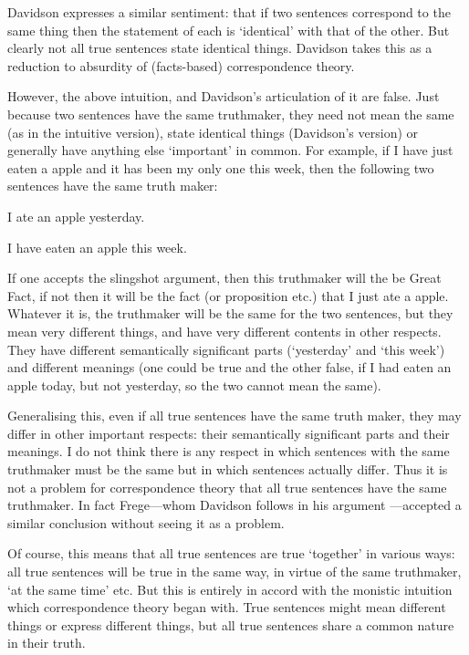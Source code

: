 Davidson expresses a similar sentiment: that if two sentences correspond to the same thing then the statement of each is `identical' with that of the other.
But clearly not all true sentences state identical things.
Davidson takes this as a reduction to absurdity of (facts-based) correspondence theory. %
\parencite[750]{Davidson_1969}

However, the above intuition, and Davidson's articulation of it are false.
Just because two sentences have the same truthmaker, they need not mean the same (as in the intuitive version), state identical things (Davidson's version) or generally have anything else `important' in common.
For example, if I have just eaten a apple and it has been my only one this week, then the following two sentences have the same truth maker:

	\begin{example} \label{yesterday}
	I ate an apple yesterday.
	\end{example}

	\begin{example} \label{week}
	I have eaten an apple this week.
	\end{example}

If one accepts the slingshot argument, then this truthmaker will the be Great Fact, if not then it will be the fact (or proposition etc.) that I just ate a apple.
Whatever it is, the truthmaker will be the same for the two sentences, but they mean very different things, and have very different contents in other respects.
They have different semantically significant parts (`yesterday' and `this week') and different meanings (one could be true and the other false, if I had eaten an apple today, but not yesterday, so the two cannot mean the same).

Generalising this, even if all true sentences have the same truth maker, they may differ in other important respects: their semantically significant parts and their meanings.
I do not think there is any respect in which sentences with the same truthmaker must be the same but in which sentences actually differ.
Thus it is not a problem for correspondence theory that all true sentences have the same truthmaker.
In fact Frege---whom Davidson follows in his argument \parencite[750]{Davidson_1969}---accepted a similar conclusion without seeing it as a problem.
\parencite[216]{Frege_1948}

Of course, this means that all true sentences are true `together' in various ways: all true sentences will be true in the same way, in virtue of the same truthmaker, `at the same time' etc.
But this is entirely in accord with the monistic intuition which correspondence theory began with.
True sentences might mean different things or express different things, but all true sentences share a common nature in their truth.

